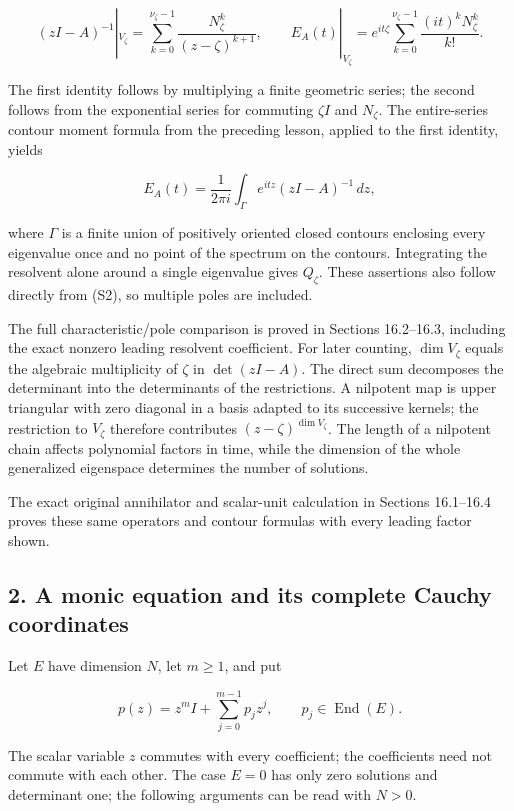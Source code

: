 \documentclass[
  11pt,
]{article}
\begin{document}
\[
(zI-A)^{-1}|_{V_\zeta}
=\sum_{k=0}^{\nu_\zeta-1}\frac{N_\zeta^k}{(z-\zeta)^{k+1}},
\qquad
E_A(t)|_{V_\zeta}
=e^{it\zeta}\sum_{k=0}^{\nu_\zeta-1}\frac{(it)^kN_\zeta^k}{k!}. \tag{S2}
\]

The first identity follows by multiplying a finite geometric series; the
second follows from the exponential series for commuting \(\zeta I\) and
\(N_\zeta\). The entire-series contour moment formula from the preceding
lesson, applied to the first identity, yields

\[
E_A(t)=\frac{1}{2\pi i}\int_\Gamma
e^{itz}(zI-A)^{-1}\,dz,                                    \tag{S3}
\]

where \(\Gamma\) is a finite union of positively oriented closed
contours enclosing every eigenvalue once and no point of the spectrum on
the contours. Integrating the resolvent alone around a single eigenvalue
gives \(Q_\zeta\). These assertions also follow directly from (S2), so
multiple poles are included.

The full characteristic/pole comparison is proved in Sections
16.2--16.3, including the exact nonzero leading resolvent coefficient.
For later counting, \(\dim V_\zeta\) equals the algebraic multiplicity
of \(\zeta\) in \(\det(zI-A)\). The direct sum decomposes the
determinant into the determinants of the restrictions. A nilpotent map
is upper triangular with zero diagonal in a basis adapted to its
successive kernels; the restriction to \(V_\zeta\) therefore contributes
\((z-\zeta)^{\dim V_\zeta}\). The length of a nilpotent chain affects
polynomial factors in time, while the dimension of the whole generalized
eigenspace determines the number of solutions.

The exact original annihilator and scalar-unit calculation in Sections
16.1--16.4 proves these same operators and contour formulas with every
leading factor shown.

\subsection{2. A monic equation and its complete Cauchy
coordinates}\label{a-monic-equation-and-its-complete-cauchy-coordinates}

Let \(E\) have dimension \(N\), let \(m\geq1\), and put

\[
p(z)=z^m I+\sum_{j=0}^{m-1}p_jz^j,
\qquad p_j\in\operatorname{End}(E).                         \tag{S4}
\]

The scalar variable \(z\) commutes with every coefficient; the
coefficients need not commute with each other. The case \(E=0\) has only
zero solutions and determinant one; the following arguments can be read
with \(N>0\).
\end{document}

